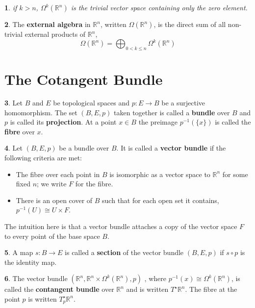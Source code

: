 \documentclass[oneside,english]{amsbook}
\numberwithin{section}{chapter}
\theoremstyle{plain}
\newtheorem{thm}{\protect\theoremname}
\theoremstyle{definition}
\newtheorem{defn}[thm]{\protect\definitionname}
\providecommand{\definitionname}{Definition}
\providecommand{\theoremname}{Theorem}
\begin{document}
			\begin{thm}
				if $k > n$, $\Omega^k(\mathbb{R}^{n})$ is the trivial vector space containing only the zero element.
			\end{thm}
			
			\begin{defn}
				The \textbf{external algebra} in $\mathbb{R}^n$, written $\Omega(\mathbb{R}^n)$, is the direct sum of all non-trivial external products of $\mathbb{R}^n$,
				\[
					\Omega(\mathbb{R}^n) = \bigoplus_{0<k\le n}\Omega^k(\mathbb{R}^n)
				\]
			\end{defn}
			
		\section{The Cotangent Bundle}
		
			\begin{defn}
				Let $B$ and $E$ be topological spaces and $p:E\to B$ be a surjective homomorphism. The set $(B, E, p)$ taken together is called a \textbf{bundle} over $B$ and $p$ is called its \textbf{projection}. At a point $x\in B$ the preimage $p^{-1}(\{x\})$ is called the \textbf{fibre} over $x$.
			\end{defn}			
			
			\begin{defn}
				Let $(B, E, p)$ be a bundle over $B$. It is called a \textbf{vector bundle} if the following criteria are met:
				\begin{itemize}
					\item The fibre over each point in $B$ is isomorphic as a vector space to $\mathbb{R}^n$ for some fixed $n$; we write $F$ for the fibre.
					\item There is an open cover of $B$ such that for each open set it contains, $p^{-1}(U)\cong U\times F$.
				\end{itemize}
			\end{defn}
			
			The intuition here is that a vector bundle attaches a copy of the vector space $F$ to every point of the base space $B$.
			
			\begin{defn}
				A map $s:B\to E$ is called a \textbf{section} of the vector bundle $(B, E, p)$ if $s\circ p$ is the identity map.
			\end{defn}
			
			\begin{defn}
				The vector bundle $(\mathbb{R}^n, \mathbb{R}^n\times \Omega^k(\mathbb{R}^n), p)$ , where $p^{-1}(x)\cong \Omega^k(\mathbb{R}^n)$, is called the \textbf{contangent bundle} over $\mathbb{R}^n$ and is written $T^\star\mathbb{R}^n$. The fibre at the point $p$ is written $T_p^\star\mathbb{R}^n$.
			\end{defn}
			
\end{document}
